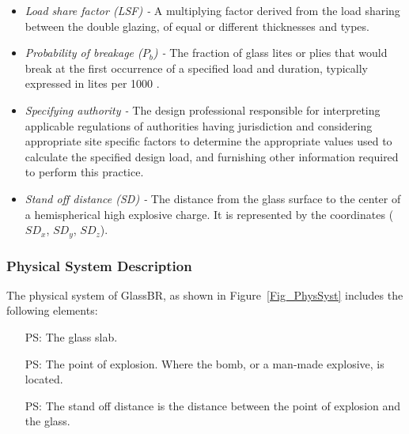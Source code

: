 \documentclass[12pt]{article}
\newcounter{physsysnum} %
\newcommand{\progname}{GlassBR}
\begin{document}
\begin{itemize}
\begin{enumerate}
\end{enumerate}

\item \textit{Load share factor (LSF) -} A multiplying factor derived from the
  load sharing between the double glazing, of equal or different thicknesses and
  types.   

\item \textit{Probability of breakage ($P_b$) -} The fraction of glass lites or 
plies that would break at the first occurrence of a specified load and duration, 
typically expressed in lites per 1000 \cite{ASTM2016}.

\item \textit{Specifying authority -} The design professional responsible for 
interpreting applicable regulations of authorities having jurisdiction and 
considering appropriate site specific factors to determine the appropriate 
values used to calculate the specified design load, and furnishing other 
information required to perform this practice.

\item \textit{Stand off distance (SD) -} The distance from the glass surface to the 
center of a hemispherical high explosive charge. It is represented by the coordinates (${SD_{x}}$, ${SD_{y}}$, ${SD_{z}}$).
 

\end{itemize}

\subsubsection{Physical System Description}

The physical system of \progname, as shown in Figure~\ref{Fig_PhysSyst} includes
the following elements:
\begin{itemize}
\item[PS\refstepcounter{physsysnum}\thephyssysnum:] The glass slab.
\item[PS\refstepcounter{physsysnum}\thephyssysnum:] The point of explosion. Where the bomb, or a man-made explosive,
  is located.\item[PS\refstepcounter{physsysnum}\thephyssysnum:] The stand off distance is the distance between the point of
  explosion and the glass. 
\end{itemize}
 
\end{document}
